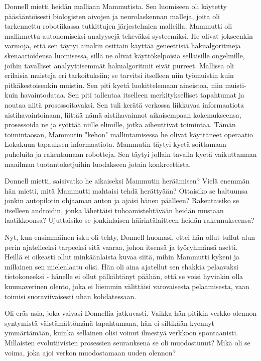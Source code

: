 Donnell mietti heidän malliaan Mammutista. Sen luomiseen oli käytetty pääsääntöisesti biologisten aivojen ja neurolaskennan malleja, joita oli tarkennettu robotiikassa tutkittujen järjestelmien malleilla. Mammutti oli mallinnettu autonomiseksi analyysejä tekeväksi systeemiksi. He olivat jokseenkin varmoja, että sen täytyi ainakin osittain käyttää geneettisiä hakualgoritmeja skenaarioidensa luomisessa, sillä ne olivat käyttökelpoisia sellaisille ongelmille, joihin tavalliset analyyttisemmät hakualgoritmit eivät purreet. Mallissa oli erilaisia muisteja eri tarkoituksiin; se tarvitsi itselleen niin työmuistin kuin pitkäkestoisenkin muistin. Sen piti kyetä luokittelemaan aineistoa, niin muisti- kuin havaintodataa. Sen piti tallentaa itselleen merkitykselliset tapahtumat ja noutaa niitä prosessoitavaksi. Sen tuli kerätä verkossa liikkuvaa informaatiota aistihavaintoinaan, liittää nämä aistihavainnot aikaisempaan kokemukseensa, prosessoida ne ja syöttää niille elimille, jotka aiheuttivat toimintaa. Tämän toimintaosan, Mammutin "kehon" mallintamisessa he olivat käyttäneet operaatio Lokakuun tapauksen informaatiota. Mammutin täytyi kyetä soittamaan puheluita ja rakentamaan robotteja. Sen täytyi jollain tavalla kyetä vaikuttamaan maailman tuotantoketjuihin luodakseen jotain konkreettista.


Donnell mietti, saisivatko he aikaiseksi Mammutin heräämisen? Vielä enemmän hän mietti, mitä Mammutti mahtaisi tehdä herättyään? Ottaisiko se haltuunsa jonkin autopilotin ohjaaman auton ja ajaisi hänen päälleen? Rakentaisiko se itselleen androidin, jonka lähettäisi tuhoamistehtävään heidän mustaan laatikkoonsa? Ujuttaisiko se jonkinlaisen häirintälaitteen heidän rakennukseensa?


Nyt, kun ensimmäinen isku oli tehty, Donnell huomasi, ettei hän ollut tullut alun perin ajatelleeksi tarpeeksi sitä vaaraa, johon itsensä ja työryhmänsä asetti. Heillä ei oikeasti ollut minkäänlaista kuvaa siitä, mihin Mammutti kykeni ja millainen sen mielenlaatu olisi. Hän oli aina ajatellut sen shakkia pelaavaksi tietokoneeksi - hänelle ei ollut pälkähtänyt päähän, että se voisi hyvinkin olla kuumaverinen olento, joka ei liiemmin välittäisi varovaisesta pelaamisesta, vaan toimisi suoraviivaisesti uhan kohdatessaan.


Oli eräs asia, joka vaivasi Donnellia jatkuvasti. Vaikka hän pitikin verkko-olennon syntymistä väistämättömänä tapahtumana, hän ei siltikään kyennyt ymmärtämään, kuinka sellainen olisi voinut ilmestyä verkkoon spontaanisti. Millaisten evolutiivisten prosessien seurauksena se oli muodostunut? Mikä oli se voima, joka ajoi verkon muodostamaan uuden olennon?


